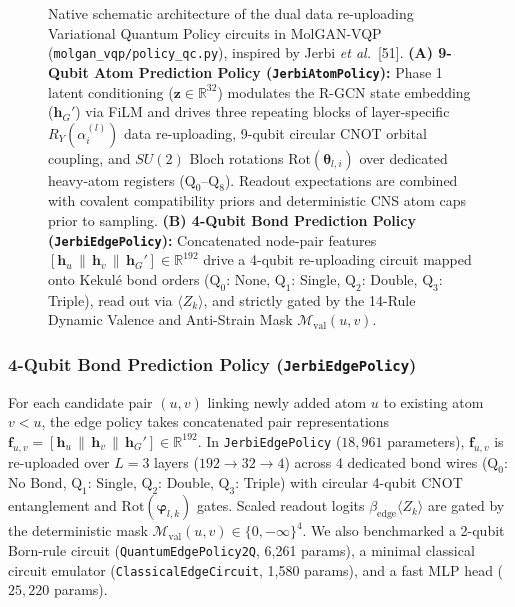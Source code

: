\documentclass[10pt,a4paper]{article}
\begin{document}
\begin{figure}[H]
\begin{subfigure}{\textwidth}
{%
}
\end{subfigure}
\caption{Native schematic architecture of the dual data re-uploading Variational Quantum Policy circuits in MolGAN-VQP (\texttt{molgan\_vqp/policy\_qc.py}), inspired by Jerbi \textit{et al.}~[51]. \textbf{(A) 9-Qubit Atom Prediction Policy (\texttt{JerbiAtomPolicy}):} Phase 1 latent conditioning ($\mathbf{z} \in \mathbb{R}^{32}$) modulates the R-GCN state embedding ($\mathbf{h}_G'$) via FiLM and drives three repeating blocks of layer-specific $R_Y(\alpha_i^{(l)})$ data re-uploading, 9-qubit circular CNOT orbital coupling, and $SU(2)$ Bloch rotations $\mathrm{Rot}(\boldsymbol{\theta}_{l,i})$ over dedicated heavy-atom registers ($\mathrm{Q}_0$--$\mathrm{Q}_8$). Readout expectations are combined with covalent compatibility priors and deterministic CNS atom caps prior to sampling. \textbf{(B) 4-Qubit Bond Prediction Policy (\texttt{JerbiEdgePolicy}):} Concatenated node-pair features $[\mathbf{h}_u \,\|\, \mathbf{h}_v \,\|\, \mathbf{h}_G'] \in \mathbb{R}^{192}$ drive a 4-qubit re-uploading circuit mapped onto Kekul\'e bond orders ($\mathrm{Q}_0$: None, $\mathrm{Q}_1$: Single, $\mathrm{Q}_2$: Double, $\mathrm{Q}_3$: Triple), read out via $\langle Z_k\rangle$, and strictly gated by the 14-Rule Dynamic Valence and Anti-Strain Mask $\mathcal{M}_{\text{val}}(u,v)$.}
\label{fig:quantum_circuits}
\end{figure}

\subsubsection*{4-Qubit Bond Prediction Policy (\texttt{JerbiEdgePolicy})}
For each candidate pair $(u, v)$ linking newly added atom $u$ to existing atom $v < u$, the edge policy takes concatenated pair representations $\mathbf{f}_{u,v} = [\mathbf{h}_u \,\|\, \mathbf{h}_v \,\|\, \mathbf{h}_G'] \in \mathbb{R}^{192}$. In \texttt{JerbiEdgePolicy} ($18,961$ parameters), $\mathbf{f}_{u,v}$ is re-uploaded over $L=3$ layers ($192 \to 32 \to 4$) across 4 dedicated bond wires ($\mathrm{Q}_0$: No Bond, $\mathrm{Q}_1$: Single, $\mathrm{Q}_2$: Double, $\mathrm{Q}_3$: Triple) with circular 4-qubit CNOT entanglement and $\mathrm{Rot}(\boldsymbol{\varphi}_{l,k})$ gates. Scaled readout logits $\beta_{\text{edge}}\langle Z_k\rangle$ are gated by the deterministic mask $\mathcal{M}_{\text{val}}(u,v) \in \{0, -\infty\}^4$. We also benchmarked a 2-qubit Born-rule circuit (\texttt{QuantumEdgePolicy2Q}, 6,261 params), a minimal classical circuit emulator (\texttt{ClassicalEdgeCircuit}, 1,580 params), and a fast MLP head ($25,220$ params).
\end{document}

